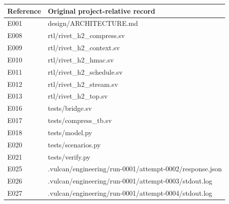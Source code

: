 \documentclass[11pt,a4paper]{article}
\begin{document}
{\small\renewcommand{\arraystretch}{1.18}\begin{longtable}{@{}L{0.12\textwidth}|L{0.82\textwidth}@{}}\toprule

\textbf{Reference} & \textbf{Original project-relative record}\\\midrule\endhead

E001 & design/\allowbreak{}ARCHITECTURE.md\\[2pt]\hline

E008 & rtl/\allowbreak{}rivet\_\allowbreak{}h2\_\allowbreak{}compress.sv\\[2pt]\hline

E009 & rtl/\allowbreak{}rivet\_\allowbreak{}h2\_\allowbreak{}context.sv\\[2pt]\hline

E010 & rtl/\allowbreak{}rivet\_\allowbreak{}h2\_\allowbreak{}hmac.sv\\[2pt]\hline

E011 & rtl/\allowbreak{}rivet\_\allowbreak{}h2\_\allowbreak{}schedule.sv\\[2pt]\hline

E012 & rtl/\allowbreak{}rivet\_\allowbreak{}h2\_\allowbreak{}stream.sv\\[2pt]\hline

E013 & rtl/\allowbreak{}rivet\_\allowbreak{}h2\_\allowbreak{}top.sv\\[2pt]\hline

E016 & tests/\allowbreak{}bridge.sv\\[2pt]\hline

E017 & tests/\allowbreak{}compress\_\allowbreak{}tb.sv\\[2pt]\hline

E018 & tests/\allowbreak{}model.py\\[2pt]\hline

E020 & tests/\allowbreak{}scenarios.py\\[2pt]\hline

E021 & tests/\allowbreak{}verify.py\\[2pt]\hline

E025 & .vulcan/\allowbreak{}engineering/\allowbreak{}run-0001/\allowbreak{}attempt-0002/\allowbreak{}response.json\\[2pt]\hline

E026 & .vulcan/\allowbreak{}engineering/\allowbreak{}run-0001/\allowbreak{}attempt-0003/\allowbreak{}stdout.log\\[2pt]\hline

E027 & .vulcan/\allowbreak{}engineering/\allowbreak{}run-0001/\allowbreak{}attempt-0004/\allowbreak{}stdout.log\\[2pt]\hline


\end{longtable}}
\end{document}
